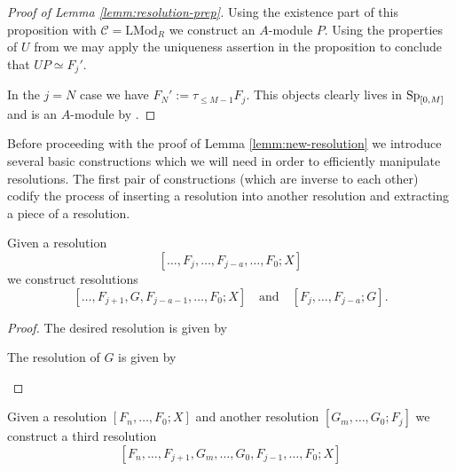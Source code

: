 \begin{proof}[Proof of Lemma \ref{lemm:resolution-prep}]
  Using the existence part of this proposition with $\mathcal{C} = \mathrm{LMod}_R$
  we construct an $A$-module $P$.
  Using the properties of $U$ from  we may apply the uniqueness assertion in the proposition to conclude that $UP \simeq F_j'$.
  
  In the $j=N$ case we have $F_N' := \tau_{\leq M-1}F_j$.
  This objects clearly lives in $\operatorname{\mathrm{Sp}}_{[0,M]}$ and is an $A$-module by .
\end{proof}

Before proceeding with the proof of Lemma \ref{lemm:new-resolution} we introduce several basic constructions which we will need in order to efficiently manipulate resolutions.
The first pair of constructions (which are inverse to each other) codify the process of inserting a resolution into another resolution and extracting a piece of a resolution.

\begin{cnstr}[Compression]  
  Given a resolution
  $$ [\dots, F_j, \dots, F_{j-a}, \dots, F_0; X] $$
  we construct resolutions
  $$ [\dots, F_{j+1}, G, F_{j-a-1}, \dots, F_0; X]\ \ \ \text{ and }\ \ \ [F_j, \dots, F_{j-a}; G]. $$
\end{cnstr}

\begin{proof}
  The desired resolution is given by
  \begin{center}
  \end{center}

  The resolution of $G$ is given by 
  \begin{center}
  \end{center}
\end{proof}

\begin{cnstr}[Insertion]
  Given a resolution $ [F_n, \dots , F_0; X] $
  and another resolution $ [G_m, \dots, G_0; F_j] $
  we construct a third resolution
  $$ [F_n, \dots, F_{j+1}, G_m, \dots, G_0, F_{j-1}, \dots, F_0; X] $$
\end{cnstr}

